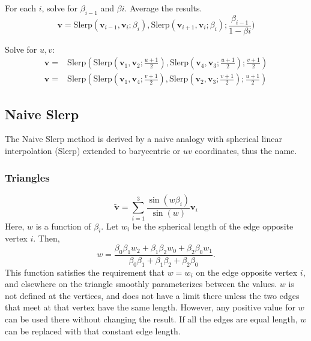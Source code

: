 \documentclass{amsart}[12pt]
\begin{document}
For each $i$, solve for $\beta_{i-1}$ and $\beta{i}$. Average the results.
\begin{equation}
\mathbf v =
\mathrm{Slerp}(\mathbf v_{i-1}, \mathbf v_i; \beta_{i}),
\mathrm{Slerp}(\mathbf v_{i+1}, \mathbf v_i; \beta_{i});
\frac{\beta_{i-1}}{1-\beta{i}})
\end{equation}

Solve for $u, v$:
\begin{equation}
  \begin{split}
\mathbf v =& \mathrm{Slerp}(
\mathrm{Slerp}(\mathbf v_1, \mathbf v_2; \frac{u+1}{2}),
\mathrm{Slerp}(\mathbf v_4, \mathbf v_3; \frac{u+1}{2}); \frac{v+1}{2})\\
\mathbf v =& \mathrm{Slerp}(
\mathrm{Slerp}(\mathbf v_1, \mathbf v_4; \frac{v+1}{2}),
\mathrm{Slerp}(\mathbf v_2, \mathbf v_3; \frac{v+1}{2}); \frac{u+1}{2})
\end{split}
\end{equation}

\subsection{Naive Slerp}
The Naive Slerp method is derived by a naive analogy with spherical linear
interpolation (Slerp) extended to barycentric or $uv$ coordinates, thus the
name.
\subsubsection{Triangles}
\begin{equation}\label{eq:nst}
   \widetilde{\mathbf v} = \sum_{i=1}^3\frac{\sin(w\beta_i)}{\sin(w)}  \mathbf v_i
\end{equation}
Here, $w$ is a function of $\beta_i$. Let $w_i$ be the spherical length of the edge opposite vertex $i$. Then,
\begin{equation}
  w = \frac{\beta_0 \beta_1 w_2 + \beta_1 \beta_2 w_0 + \beta_2 \beta_0 w_1}
      {\beta_0 \beta_1 + \beta_1 \beta_2 + \beta_2 \beta_0}.
\end{equation}
This function satisfies the requirement that $w = w_i$ on the edge opposite
vertex $i$, and elsewhere on the triangle smoothly parameterizes between the
values. $w$ is not defined at the vertices, and does not have a limit there
unless the two edges that meet at that vertex have the same length. However,
any positive value for $w$ can be used there without changing the result.
If all the edges are equal length,
$w$ can be replaced with that constant edge length.
\end{document}
